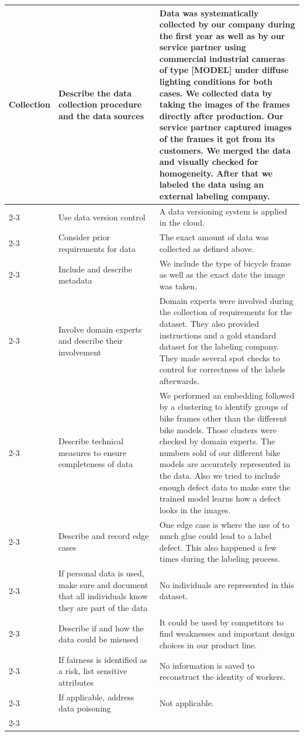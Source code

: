 {\begin{longtable}{p{0.15\linewidth}|p{0.35\linewidth}p{0.5\linewidth}}
    \hline
    Collection        
        & Describe the data collection procedure and the data sources        & Data was systematically collected by our company during the first year as well as by our service partner  using  commercial industrial cameras of type [MODEL] under diffuse lighting conditions for both cases. We collected data by taking the images of the frames directly after production. Our service partner captured images of the frames it got from its customers. We merged the data and visually checked for homogeneity. After that we labeled the data using an external labeling company.  \\\cline{2-3}
        
        \pagebreak
        \cline{2-3}
        & Use data version control                                  & A data versioning system is applied in the cloud.\\\cline{2-3}
        & Consider prior requirements for data                      & The exact amount of data was collected as defined above.\\\cline{2-3}
        & Include and describe metadata                             & We include the type of bicycle frame as well as the exact date the image was taken. \\\cline{2-3}  
        & Involve domain experts and describe their involvement     & Domain experts were involved during the collection of requirements for the dataset. They also provided instructions and a gold standard dataset for the labeling company. They made several spot checks to control for correctness of the labels afterwards.       \\\cline{2-3}
        & Describe technical measures to ensure completeness of data & We performed an embedding followed by a clustering to identify groups of bike frames other than the different bike models. Those clusters were checked by domain experts. The numbers sold of our different bike models are accurately represented in the data. Also we tried to include enough defect data to make sure the trained model learns how a defect looks in the images.    \\\cline{2-3}
        & Describe and record edge cases                            & One edge case is where the use of to much glue could lead to a label defect. This also happened a few times during the labeling process.    \\\cline{2-3}
        & If personal data is used, make sure and document that all individuals know they are part of the data & No individuals are represented in this dataset.        \\\cline{2-3}
        & Describe if and how the data could be misused & It could be used by competitors to find weaknesses and important design choices in our product line.       \\\cline{2-3}
        & If fairness is identified as a risk, list sensitive attributes & No information is saved to reconstruct the identity of workers.  \\\cline{2-3}
        & If applicable, address data poisoning                     &  Not applicable.    \\\cline{2-3}
    

\end{longtable}}
